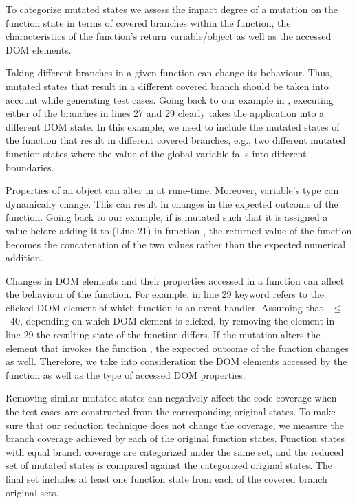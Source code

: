 To categorize mutated states we assess the impact degree of a mutation on the function state in terms of covered branches within the function, the characteristics of the function's return variable/object as well as the accessed DOM elements.
\begin{description}[noitemsep, leftmargin=0.4cm]
\item[Branch coverage:] Taking different branches in a given function can change its behaviour. Thus, mutated states that result in a different covered branch should be taken into account while generating test cases. Going back to our example in , executing either of the branches in lines 27 and 29 clearly takes the application into a different DOM state. In this example, we need to include the  mutated states of the  function that result in different covered branches, e.g., two different mutated function states where the value of the 
global variable  falls into different boundaries. 
\item[Return variable/object characteristics:] Properties of an object can alter in \javascript at rune-time. Moreover, variable's type can dynamically change. This can result in changes in the expected outcome of the function. Going back to our example, if  is mutated such that it is assigned a  value before adding it to  (Line 21) in function , the returned value of the function becomes the  concatenation of the two values rather than the expected numerical addition. 
\item[Accessed DOM properties:] Changes in DOM elements and their properties accessed in a function can affect the behaviour of the function. For example, in line 29  keyword refers to the clicked DOM element of which function  is an event-handler. Assuming that ~$\leq$~40, depending on which DOM element is clicked, by removing the element in line 29 the resulting state of the function  differs. If the mutation alters the element that invokes the function , the expected outcome of the function changes as well. 
Therefore, we take into consideration the DOM elements accessed by the function as well as the type of accessed DOM properties.
\end{description}

Removing similar mutated states can negatively affect the code coverage when the test cases are constructed from the corresponding original states. To make sure that our reduction technique does not change the coverage, we measure the branch coverage achieved by each of the original function states. Function states with equal branch coverage are categorized under the same set, and the reduced set of mutated states is compared against the categorized original states. The final set includes at least one function state from each of the covered branch original sets.

